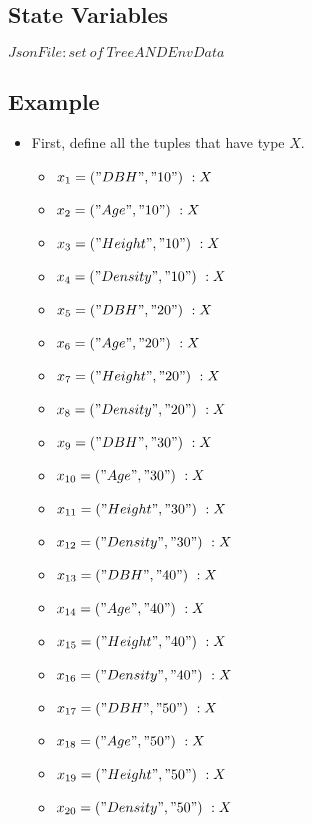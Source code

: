 \documentclass[12pt, titlepage]{article}
\begin{document}
\subsection{State Variables}
$JsonFile : set\ of\ TreeANDEnvData$


\subsection{Example}
\begin{itemize}
    \item 
First, define all the tuples that have type $X$.
\begin{itemize}
    \item $x_1 = ("DBH", "10")\ :X$
    \item $x_2 = ("Age", "10")\ :X$
    \item $x_3 = ("Height", "10")\ :X$
    \item $x_4 = ("Density", "10")\ :X$
    \vspace{0.5cm}

    \item $x_5 = ("DBH", "20")\ :X$
    \item $x_6 = ("Age", "20")\ :X$
    \item $x_7 = ("Height", "20")\ :X$
    \item $x_8 = ("Density", "20")\ :X$
    \vspace{0.5cm}
    
    \item $x_9 = ("DBH", "30")\ :X$
    \item $x_{10} = ("Age", "30")\ :X$
    \item $x_{11} = ("Height", "30")\ :X$
    \item $x_{12} = ("Density", "30")\ :X$
    \vspace{0.5cm}
    
    \renewcommand{\attr}{40}
    \item $x_{13} = ("DBH", "\attr")\ :X$
    \item $x_{14} = ("Age", "\attr")\ :X$
    \item $x_{15} = ("Height", "\attr")\ :X$
    \item $x_{16} = ("Density", "\attr")\ :X$
    \vspace{0.5cm}

    \renewcommand{\attr}{50}
    \item $x_{17} = ("DBH", "\attr")\ :X$
    \item $x_{18} = ("Age", "\attr")\ :X$
    \item $x_{19} = ("Height", "\attr")\ :X$
    \item $x_{20} = ("Density", "\attr")\ :X$
    \vspace{0.5cm}


\end{itemize}
\end{itemize}
\end{document}
